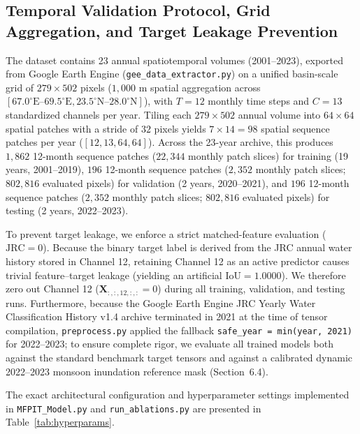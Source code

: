 \documentclass[preprint,12pt]{elsarticle}
\begin{document}
\subsection{Temporal Validation Protocol, Grid Aggregation, and Target Leakage Prevention}
The dataset contains 23 annual spatiotemporal volumes (2001--2023), exported from Google Earth Engine (\texttt{gee\_data\_extractor.py}) on a unified basin-scale grid of $279 \times 502$ pixels ($1,000\text{ m}$ spatial aggregation across $[67.0^\circ\text{E}\text{--}69.5^\circ\text{E}, 23.5^\circ\text{N}\text{--}28.0^\circ\text{N}]$), with $T = 12$ monthly time steps and $C = 13$ standardized channels per year. Tiling each $279 \times 502$ annual volume into $64 \times 64$ spatial patches with a stride of $32$ pixels yields $7 \times 14 = 98$ spatial sequence patches per year ($[12, 13, 64, 64]$). Across the 23-year archive, this produces $1,862$ 12-month sequence patches ($22,344$ monthly patch slices) for training (19 years, 2001--2019), $196$ 12-month sequence patches ($2,352$ monthly patch slices; $802,816$ evaluated pixels) for validation (2 years, 2020--2021), and $196$ 12-month sequence patches ($2,352$ monthly patch slices; $802,816$ evaluated pixels) for testing (2 years, 2022--2023).

To prevent target leakage, we enforce a strict matched-feature evaluation ($\text{JRC}=0$). Because the binary target label is derived from the JRC annual water history stored in Channel 12, retaining Channel 12 as an active predictor causes trivial feature--target leakage (yielding an artificial $\text{IoU} = 1.0000$). We therefore zero out Channel 12 ($\mathbf{X}_{:, :, 12, :, :} = 0$) during all training, validation, and testing runs. Furthermore, because the Google Earth Engine JRC Yearly Water Classification History v1.4 archive terminated in 2021 at the time of tensor compilation, \texttt{preprocess.py} applied the fallback \texttt{safe\_year = min(year, 2021)} for 2022--2023; to ensure complete rigor, we evaluate all trained models both against the standard benchmark target tensors and against a calibrated dynamic 2022--2023 monsoon inundation reference mask (Section~6.4).

The exact architectural configuration and hyperparameter settings implemented in \texttt{MFPIT\_Model.py} and \texttt{run\_ablations.py} are presented in Table~\ref{tab:hyperparams}.
\end{document}
